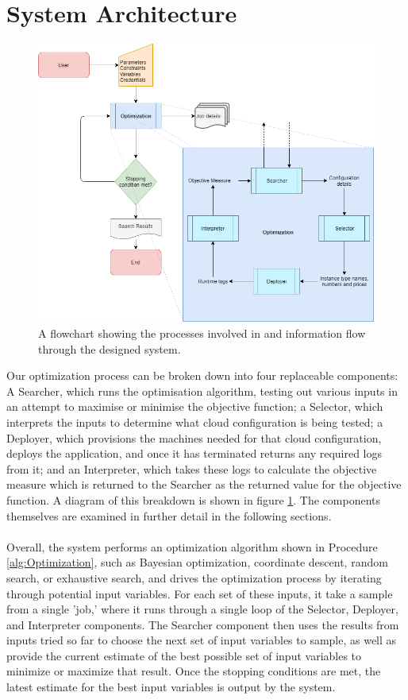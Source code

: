 \documentclass{report}
\begin{document}
\section{System Architecture}
\begin{figure}[!hb]
  \centering
   \includegraphics[scale=0.5]{Design_flowchart}
  \caption{A flowchart showing the processes involved in and information flow through the designed system.}
  \label{fig:design}
\end{figure}
\newpage
Our optimization process can be broken down into four replaceable components: A Searcher, which runs the optimisation algorithm, testing out various inputs in an attempt to maximise or minimise the objective function; a Selector, which interprets the inputs to determine what cloud configuration is being tested; a Deployer, which provisions the machines needed for that cloud configuration, deploys the application, and once it has terminated returns any required logs from it; and an Interpreter, which takes these logs to calculate the objective measure which is returned to the Searcher as the returned value for the objective function. A diagram of this breakdown is shown in figure \ref{fig:design}. The components themselves are examined in further detail in the following sections.
 
\paragraph{}
Overall, the system performs an optimization algorithm shown in Procedure \ref{alg:Optimization}, such as Bayesian optimization, coordinate descent, random search, or exhaustive search, and drives the optimization process by iterating through potential input variables. For each set of these inputs, it take a sample from a single 'job,' where it runs through a single loop of the Selector, Deployer, and Interpreter components. The Searcher component then uses the results from inputs tried so far to choose the next set of input variables to sample, as well as provide the current estimate of the best possible set of input variables to minimize or maximize that result. Once the stopping conditions are met, the latest estimate for the best input variables is output by the system.
\end{document}
